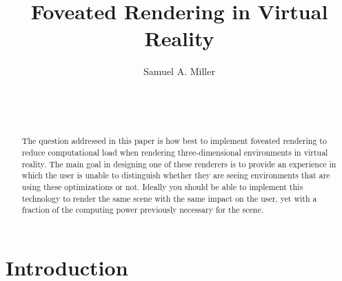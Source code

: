\documentclass{sig-alternate}
\begin{document}

\title{Foveated Rendering in Virtual Reality}


\author{
\alignauthor
Samuel A. Miller\\
	\\
	\\
	\\
}

\maketitle
\begin{abstract}

The question addressed in this paper is how best to implement foveated rendering to reduce computational load when rendering three-dimensional environments in virtual reality. The main goal in designing one of these renderers is to provide an experience in which the user is unable to distinguish whether they are seeing environments that are using these optimizations or not. Ideally you should be able to implement this technology to render the same scene with the same impact on the user, yet with a fraction of the computing power previously necessary for the scene.
\end{abstract}


\section{Introduction}
\label{sec:intro}
\end{document}
